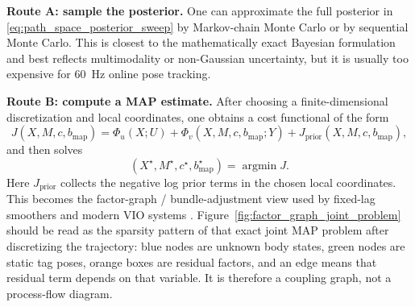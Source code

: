 \documentclass[11pt]{report}
\newcommand{\argmin}{\operatorname*{argmin}}
\begin{document}
\textbf{Route A: sample the posterior.} One can approximate the full posterior in \eqref{eq:path_space_posterior_sweep} by Markov-chain Monte Carlo or by sequential Monte Carlo. This is closest to the mathematically exact Bayesian formulation and best reflects multimodality or non-Gaussian uncertainty, but it is usually too expensive for 60~Hz online pose tracking.

\textbf{Route B: compute a MAP estimate.} After choosing a finite-dimensional discretization and local coordinates, one obtains a cost functional of the form
\begin{equation}
J(X,M,c,b_{\mathrm{map}})=\Phi_u(X;U)+\Phi_v(X,M,c,b_{\mathrm{map}};Y)+J_{\mathrm{prior}}(X,M,c,b_{\mathrm{map}}),
\end{equation}
and then solves
\begin{equation}
(X^\star,M^\star,c^\star,b_{\mathrm{map}}^\star)=\argmin J.
\end{equation}
Here $J_{\mathrm{prior}}$ collects the negative log prior terms in the chosen local coordinates. This becomes the factor-graph / bundle-adjustment view used by fixed-lag smoothers and modern VIO systems \citep{leutenegger2015okvis,forster2017preintegration,kaess2012isam2}. Figure~\ref{fig:factor_graph_joint_problem} should be read as the sparsity pattern of that exact joint MAP problem after discretizing the trajectory: blue nodes are unknown body states, green nodes are static tag poses, orange boxes are residual factors, and an edge means that residual term depends on that variable. It is therefore a coupling graph, not a process-flow diagram.
\end{document}
